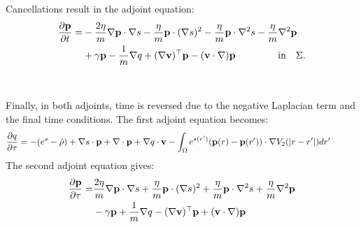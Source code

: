 Cancellations result in the adjoint equation:
\begin{align*}
\frac{\partial \mathbf{p}}{\partial t} =& 
- \frac{2 \eta}{m} \nabla \mathbf{p} \cdot \nabla s - \frac{\eta}{m} \mathbf{p} \cdot (\nabla s)^2 - \frac{\eta}{m} \mathbf{p} \cdot \nabla^2 s - \frac{\eta}{m} \nabla^2 \mathbf{p} \\
&  +\gamma  \mathbf{p}-\frac{1}{m} \nabla q + (\nabla \mathbf{v})^\top\mathbf{p} - (\mathbf{v} \cdot \nabla)\mathbf{p}   \ \qquad\qquad \text{in} \quad \Sigma.
\end{align*}
\\
\\
Finally, in both adjoints, time is reversed due to the negative Laplacian term and the final time conditions. 
The first adjoint equation becomes:
\begin{align*}
& \frac{\partial q}{\partial \tau} = - (e^s - \hat \rho)  + \nabla s \cdot \mathbf{p} + \nabla\cdot \mathbf{p}  +  \nabla q \cdot \mathbf{v} - \int_\Omega  e^{s(r')}(\mathbf{p}(r) - \mathbf{p}(r')) \cdot\nabla V_2(|r-r'|)   dr'   \qquad 
\end{align*}
The second adjoint equation gives:
\begin{align*}
\frac{\partial \mathbf{p}}{\partial \tau} =& 
 \frac{2 \eta}{m} \nabla \mathbf{p} \cdot \nabla s + \frac{\eta}{m} \mathbf{p} \cdot (\nabla s)^2 + \frac{\eta}{m} \mathbf{p} \cdot \nabla^2 s + \frac{\eta}{m} \nabla^2 \mathbf{p} \\
&  -\gamma  \mathbf{p} + \frac{1}{m} \nabla q - (\nabla \mathbf{v})^\top\mathbf{p} + (\mathbf{v} \cdot \nabla)\mathbf{p}
\end{align*}